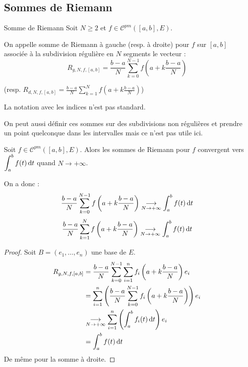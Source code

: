 \subsection{Sommes de Riemann}

\begin{definition}{Somme de Riemann}{}
    Soit $N \geqslant 2$ et $f \in \mathscr C^{pm}([a, b], E)$.

    On appelle somme de Riemann à gauche (resp. à droite) pour $f$ sur $[a, b]$ associée à la 
    subdivision régulière en $N$ segments le vecteur :
    \[R_{g, N, f, [a, b]} = \frac{b-a} N \sum_{k=0}^{N-1} f\left( a + k \frac{b-a}{N} \right)\]

    (resp. $\displaystyle R_{d, N, f, [a, b]} = \frac{b-a} N \sum_{k=1}^{N} f\left( a + k \frac{b-a}{N} \right)$)
\end{definition}

\begin{remarque}
    La notation avec les indices n'est pas standard.
    
    On peut aussi définir ces sommes sur des subdivisions non régulières et prendre un point quelconque dans les intervalles mais ce n'est pas utile ici.
\end{remarque}

\begin{proposition}{}{}
    Soit $f \in \mathscr C^{pm}([a, b], E)$. Alors les sommes de Riemann pour $f$ convergent vers 
    $\displaystyle \int_a^b f(t) \,\mathrm{d}t$ quand $N \to +\infty$.

    On a donc :
    \[\frac{b - a }{N } \sum_{k = 0 }^{N - 1 } f\left( a + k \frac{b - a } N \right) \underset{N \to + \infty}{\longrightarrow} \int_a^b f(t) \,\mathrm{d}t\]
    \[\frac{b - a }{N } \sum_{k = 1 }^{N} f\left( a + k \frac{b - a } N \right) \underset{N \to + \infty}{\longrightarrow} \int_a^b f(t) \,\mathrm{d}t\]
\end{proposition}


\begin{proof}
Soit $B= (e_1,\dots,e_n)$ une base de $E$.
    \begin{align*}
        R_{g, N, f, [a, b]} & = \frac{b - a }{N } \sum_{k = 0 }^{N - 1 } \sum_{i = 1 }^{n } f_i\left( a + k \frac{b - a } N \right) e_i \\
        & = \sum_{i = 1 }^{n } \left( \frac{b - a }{N } \sum_{k = 0 }^{N - 1 } f_i\left( a + k \frac{b - a } N \right) \right) e_i \\
        & \underset{N \to + \infty}{\longrightarrow} \sum_{i = 1 }^{n } \left( \int_a^b f_i(t) \,\mathrm{d}t \right) e_i \\
        & = \int_a^b f(t) \,\mathrm{d}t
    \end{align*}
De même pour la somme à droite.
\end{proof}

